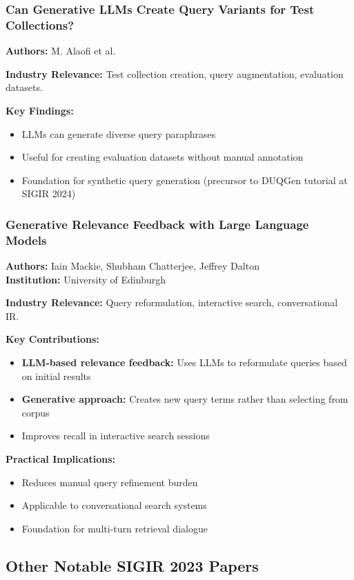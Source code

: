 \documentclass[11pt,letterpaper]{article}
\begin{document}
\subsubsection{Can Generative LLMs Create Query Variants for Test Collections?}
\textbf{Authors:} M. Alaofi et al.

\textbf{Industry Relevance:} Test collection creation, query augmentation, evaluation datasets.

\textbf{Key Findings:}
\begin{itemize}[leftmargin=*]
    \item LLMs can generate diverse query paraphrases
    \item Useful for creating evaluation datasets without manual annotation
    \item Foundation for synthetic query generation (precursor to DUQGen tutorial at SIGIR 2024)
\end{itemize}

\subsubsection{Generative Relevance Feedback with Large Language Models}
\textbf{Authors:} Iain Mackie, Shubham Chatterjee, Jeffrey Dalton\\
\textbf{Institution:} University of Edinburgh

\textbf{Industry Relevance:} Query reformulation, interactive search, conversational IR.

\textbf{Key Contributions:}
\begin{itemize}[leftmargin=*]
    \item \textbf{LLM-based relevance feedback:} Uses LLMs to reformulate queries based on initial results
    \item \textbf{Generative approach:} Creates new query terms rather than selecting from corpus
    \item Improves recall in interactive search sessions
\end{itemize}

\textbf{Practical Implications:}
\begin{itemize}[leftmargin=*]
    \item Reduces manual query refinement burden
    \item Applicable to conversational search systems
    \item Foundation for multi-turn retrieval dialogue
\end{itemize}

\subsection{Other Notable SIGIR 2023 Papers}
\end{document}
